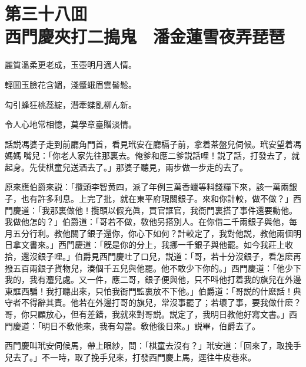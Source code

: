 
\chapter*{第三十八囬　\\西門慶夾打二搗鬼　潘金蓮雪夜弄琵琶}


\begin{myquote}
麗質溫柔更老成，玉壺明月適人情。

輕囬玉臉花含媚，淺蹙蛾眉雲髻鬆。

勾引蜂狂桃蕊綻，潛牽蝶亂柳ん新。

令人心地常相憶，莫學章臺贈淡情。
\end{myquote}

話説馮婆子走到前廳角門首，看見玳安在廳槅子前，拿着茶盤兒伺候。玳安望着馮媽媽𢫓嘴兒：「你老人家先往那裏去。俺爹和應二爹説話哩！説了話，打發去了，就起身。先使棋童兒送酒去了。」那婆子聽見，兩步做一步走的去了。

原來應伯爵來説：「攬頭李智黄四，派了年例三萬香蠟等料錢糧下來，該一萬兩銀子，也有許多利息。上完了批，就在東平府現關銀子。來和你計較，做不做？」西門慶道：「我那裏做他！攬頭以假充眞，買官誆官，我衙門裏搭了事件還要動他。我做他怎的？」伯爵道：「哥若不做，敎他另搭別人。在你借二千兩銀子與他，每月五分行利。教他關了銀子還你，你心下如何？計較定了，我對他説，教他兩個明日拿文書來。」西門慶道：「旣是你的分上，我挪一千銀子與他罷。如今我莊上收拾，還沒銀子哩。」伯爵見西門慶吐了口兒，説道：「哥，若十分沒銀子，看怎麽再撥五百兩銀子貨物兒，湊個千五兒與他罷。他不敢少下你的。」西門慶道：「他少下我的，我有灋兒處。又一件，應二哥，銀子便與他，只不呌他打着我的旗兒在外邊東誆西騙！我打聽出來，只怕我衙門監裏放不下他。」伯爵道：「哥説的什麽話！典守者不得辭其責。他若在外邊打哥的旗兒，常沒事罷了；若壞了事，要我做什麽？哥，你只顧放心，但有差錯，我就來對哥説。説定了，我明日教他好寫文書。」西門慶道：「明日不敎他來，我有勾當。敎他後日來。」説畢，伯爵去了。

西門慶叫玳安伺候馬，帶上眼紗，問：「棋童去沒有？」玳安道：「回來了，取挽手兒去了。」不一時，取了挽手兒來，打發西門慶上馬，逕往牛皮巷來。


